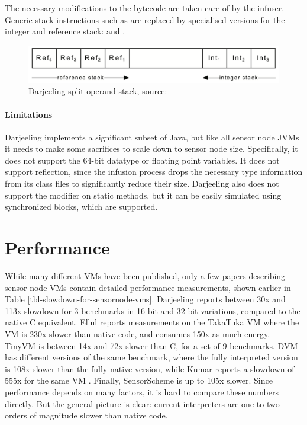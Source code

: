 The necessary modifications to the bytecode are taken care of by the infuser. Generic stack instructions such as  are replaced by specialised versions for the integer and reference stack:  and .

\begin{figure}
\centering
\includegraphics[width=0.6\linewidth]{darjeeling-split-stack}
\caption[Darjeeling split operand stack]{Darjeeling split operand stack, source: \cite{Brouwers:2009cj}}
\label{fig-darjeeling-split-stack}
\end{figure}

\paragraph{Limitations}
Darjeeling implements a significant subset of Java, but like all sensor node JVMs it needs to make some sacrifices to scale down to sensor node size. Specifically, it does not support the 64-bit  datatype or floating point variables. It does not support reflection, since the infusion process drops the necessary type information from its class files to significantly reduce their size. Darjeeling also does not support the  modifier on static methods, but it can be easily simulated using synchronized blocks, which are supported.

\section{Performance}
While many different VMs have been published, only a few papers describing sensor node VMs contain detailed performance measurements, shown earlier in Table \ref{tbl-slowdown-for-sensornode-vms}. Darjeeling \cite{Brouwers:2009cj} reports between 30x and 113x slowdown for 3 benchmarks in 16-bit and 32-bit variations, compared to the native C equivalent. Ellul \cite{Ellul:2012thesis} reports measurements on the TakaTuka VM \cite{Aslam:2008} where the VM is 230x slower than native code, and consumes 150x as much energy. TinyVM \cite{Hong:2012wj} is between 14x and 72x slower than C, for a set of 9 benchmarks. DVM \cite{Balani:2006} has different versions of the same benchmark, where the fully interpreted version is 108x slower than the fully native version, while Kumar reports a slowdown of 555x for the same VM \cite{Kumar:2007ge}. Finally, SensorScheme \cite{Evers:2010ur} is up to 105x slower. Since performance depends on many factors, it is hard to compare these numbers directly. But the general picture is clear: current interpreters are one to two orders of magnitude slower than native code.


